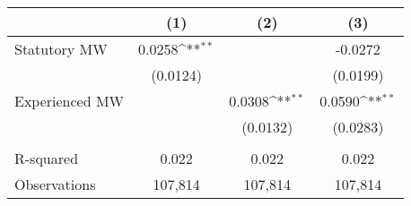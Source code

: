 {
\def\sym#1{\ifmmode^{#1}\else\(^{#1}\)\fi}
\begin{tabular}{l*{3}{c}}
\hline\hline
          &\multicolumn{1}{c}{(1)}         &\multicolumn{1}{c}{(2)}         &\multicolumn{1}{c}{(3)}         \\
\hline
Statutory MW&   0.0258\sym{**} &                  &  -0.0272         \\
          & (0.0124)         &                  & (0.0199)         \\
[1em]
Experienced MW&                  &   0.0308\sym{**} &   0.0590\sym{**} \\
          &                  & (0.0132)         & (0.0283)         \\
\hline
\vspace{-2mm}&                  &                  &                  \\
R-squared &    0.022         &    0.022         &    0.022         \\
Observations&  107,814         &  107,814         &  107,814         \\
\hline\hline
\end{tabular}
}
